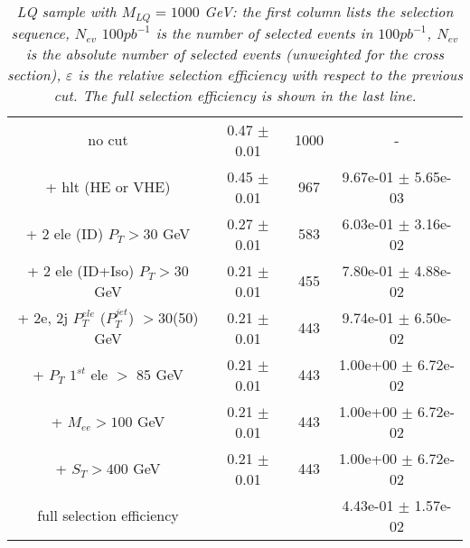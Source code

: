 \documentclass[colclass=cmspaper]{combine}
\begin{document}
\begin{linenumbers}
\begin{table}[htbp]
\begin{center}
\begin{tabular}{|c|c|c|c|}
no cut &0.47 $\pm$ 0.01& 1000 & - \\
+ hlt (HE or VHE) &0.45 $\pm$ 0.01& 967 & 9.67e-01 $\pm$ 5.65e-03\\
+ 2 ele (ID) $P_{T} >30$ GeV &0.27 $\pm$ 0.01& 583 & 6.03e-01 $\pm$ 3.16e-02\\
+ 2 ele (ID+Iso) $P_{T} >30$ GeV &0.21 $\pm$ 0.01& 455 & 7.80e-01 $\pm$ 4.88e-02\\
+ 2e, 2j $P_{T}^{ele}$ ($P_{T}^{jet}$) $>$30(50) GeV &0.21 $\pm$ 0.01& 443 & 9.74e-01 $\pm$ 6.50e-02\\
+ $P_{T}$ $1^{st}$ ele $>$ 85 GeV &0.21 $\pm$ 0.01& 443 & 1.00e+00 $\pm$ 6.72e-02\\
+ $M_{ee} >100$ GeV&0.21 $\pm$ 0.01& 443 & 1.00e+00 $\pm$ 6.72e-02\\
+ $S_{T} >400$ GeV &0.21 $\pm$ 0.01& 443 & 1.00e+00 $\pm$ 6.72e-02\\
\hline

full selection efficiency& &  & 4.43e-01 $\pm$ 1.57e-02\\
\hline
\end{tabular}
\end{center}
\caption{\small \sl LQ sample with $M_{LQ}=1000$ GeV: the first column lists the selection sequence, $N_{ev}$ $100pb^{-1}$ is the number of selected events in $100pb^{-1}$, $N_{ev}$ is the absolute number of selected events (unweighted for the cross section), $\varepsilon$ is the relative selection efficiency with respect to the previous cut. The full selection efficiency is shown in the last line.}
\label{tab:selection_effic_1000}
\end{table}





\end{linenumbers}
\end{document}
